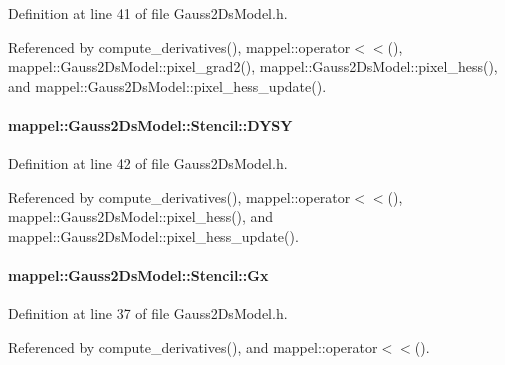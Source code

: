 Definition at line 41 of file Gauss2\+Ds\+Model.\+h.



Referenced by compute\+\_\+derivatives(), mappel\+::operator$<$$<$(), mappel\+::\+Gauss2\+Ds\+Model\+::pixel\+\_\+grad2(), mappel\+::\+Gauss2\+Ds\+Model\+::pixel\+\_\+hess(), and mappel\+::\+Gauss2\+Ds\+Model\+::pixel\+\_\+hess\+\_\+update().

\paragraph[{\texorpdfstring{D\+Y\+SY}{DYSY}}]{ mappel\+::\+Gauss2\+Ds\+Model\+::\+Stencil\+::\+D\+Y\+SY}\hypertarget{classmappel_1_1Gauss2DsModel_1_1Stencil_a8d76c66cd342f236d5197aa121549468}{}\label{classmappel_1_1Gauss2DsModel_1_1Stencil_a8d76c66cd342f236d5197aa121549468}


Definition at line 42 of file Gauss2\+Ds\+Model.\+h.



Referenced by compute\+\_\+derivatives(), mappel\+::operator$<$$<$(), mappel\+::\+Gauss2\+Ds\+Model\+::pixel\+\_\+hess(), and mappel\+::\+Gauss2\+Ds\+Model\+::pixel\+\_\+hess\+\_\+update().

\paragraph[{\texorpdfstring{Gx}{Gx}}]{ mappel\+::\+Gauss2\+Ds\+Model\+::\+Stencil\+::\+Gx}\hypertarget{classmappel_1_1Gauss2DsModel_1_1Stencil_aa67240576642d270bdc6f5678e16a3f9}{}\label{classmappel_1_1Gauss2DsModel_1_1Stencil_aa67240576642d270bdc6f5678e16a3f9}


Definition at line 37 of file Gauss2\+Ds\+Model.\+h.



Referenced by compute\+\_\+derivatives(), and mappel\+::operator$<$$<$().

